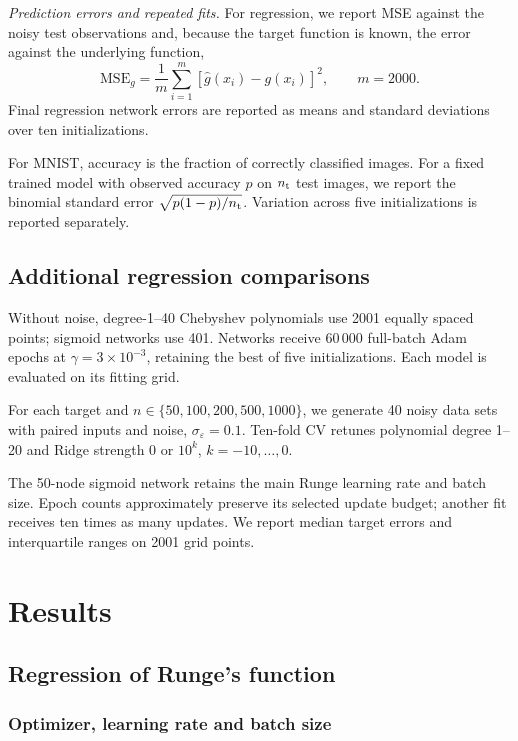 \documentclass[aps,prb,reprint,superscriptaddress,nofootinbib,longbibliography,floatfix]{revtex4-2}
\newcommand{\Mf}{\mathrm{MSE}_{g}}
\begin{document}
\emph{Prediction errors and repeated fits.}
For regression, we report MSE against the noisy test observations and, because the target function is known, the error against the underlying function,
\[
\Mf=\frac1m\sum_{i=1}^m
\left[\hat g(x_i)-g(x_i)\right]^2,
\qquad m=2000.
\]
Final regression network errors are reported as means and standard deviations over ten initializations.

For MNIST, accuracy is the fraction of correctly classified images. For a fixed trained model with observed accuracy $p$ on $n_{\rm t}$ test images, we report the binomial standard error
$\sqrt{p(1-p)/n_{\rm t}}$. Variation across five initializations is reported separately.

\subsection{Additional regression comparisons}

Without noise, degree-1--40 Chebyshev polynomials use 2001 equally spaced points; sigmoid networks use 401. Networks receive 60\,000 full-batch Adam epochs at $\gamma=3\times10^{-3}$, retaining the best of five initializations. Each model is evaluated on its fitting grid.

For each target and $n\in\{50,100,200,500,1000\}$, we generate 40 noisy data sets with paired inputs and noise, $\sigma_\varepsilon=0.1$. Ten-fold CV retunes polynomial degree 1--20 and Ridge strength $0$ or $10^k$, $k=-10,\ldots,0$.

The 50-node sigmoid network retains the main Runge learning rate and batch size. Epoch counts approximately preserve its selected update budget; another fit receives ten times as many updates. We report median target errors and interquartile ranges on 2001 grid points.

\section{Results}\label{sec:results}

\subsection{Regression of Runge's function}\label{sec:res_runge}

\subsubsection{Optimizer, learning rate and batch size}\label{sec:res_lr}
\end{document}
